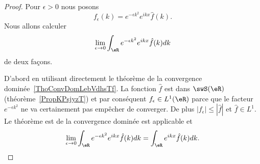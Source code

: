 \begin{proof}
    Pour \( \epsilon>0\) nous posons
    \begin{equation}
        f_{\epsilon}(k)= e^{-\epsilon k^2} e^{ikx}\hat f(k).
    \end{equation}
    Nous allons calculer
    \begin{equation}
        \lim_{\epsilon\to 0}\int_{\eR} e^{-\epsilon k^2} e^{ikx}\hat f(k)dk
    \end{equation}
    de deux façons.

    D'abord en utilisant directement le théorème de la convergence dominée~\ref{ThoConvDomLebVdhsTf}. La fonction \( \hat f\) est dans \( \swS(\eR)\) (théorème~\ref{PropKPsjyzT}) et par conséquent \( f_{\epsilon}\in L^1(\eR)\) parce que le facteur \(  e^{-\epsilon k^2}\) ne va certainement pas empêcher de converger. De plus \( | f_{\epsilon} |\leq | \hat f |\) et \( \hat f\in L^1\). Le théorème est de la convergence dominée est applicable et
    \begin{equation}        \label{EQooYIYGooXYubbW}
        \lim_{\epsilon\to 0}\int_{\eR} e^{-\epsilon k^2} e^{ikx}\hat f(k)dk=\int_{\eR} e^{ikx}\hat f(k)dk.
    \end{equation}


\end{proof}
